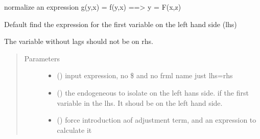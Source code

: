 \documentclass[letterpaper,10pt,english]{sphinxmanual}
\begin{document}

\begin{fulllineitems}
\label{\detokenize{index:modelnormalize.normal}}
\pysigstartsignatures
{}
\pysigstopsignatures
\sphinxAtStartPar
normalize an expression g(y,x) = f(y,x) ==\textgreater{} y = F(x,z)

\sphinxAtStartPar
Default find the expression for the first variable on the left hand side (lhs)

\sphinxAtStartPar
The variable \sphinxhyphen{} without lags\sphinxhyphen{}  should not be on rhs.
\begin{quote}\begin{description}
\item[{Parameters}] \leavevmode\begin{itemize}
\item {} 
\sphinxAtStartPar
{} () \textendash{} input expression, no \$ and no frml name just lhs=rhs

\item {} 
\sphinxAtStartPar
{} (\sphinxstyleliteralemphasis{\sphinxupquote{, }}) \textendash{} the endogeneous to isolate on the left hans side. if the first variable in the lhs.
It shoud be on the left hand side.

\item {} 
\sphinxAtStartPar
{} (\sphinxstyleliteralemphasis{\sphinxupquote{, }}) \textendash{} force introduction aof adjustment term, and an expression to calculate it


\end{itemize}
\end{description}
\end{quote}
\end{fulllineitems}
\end{document}
